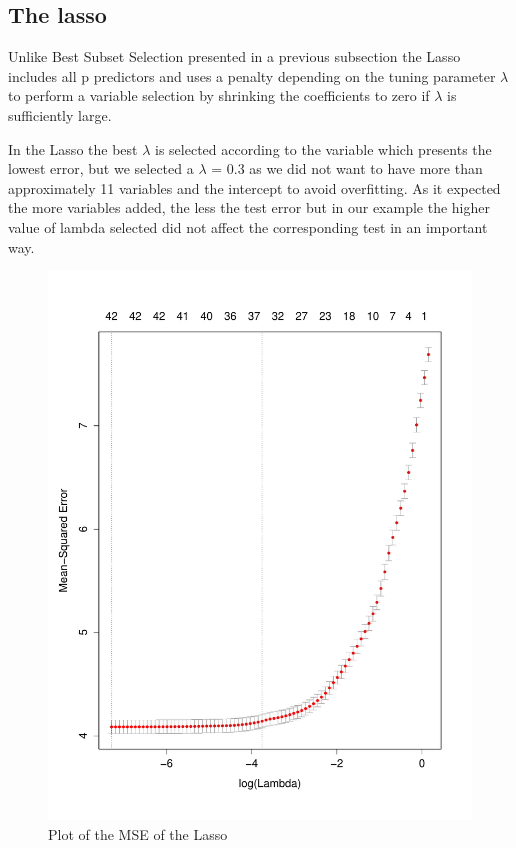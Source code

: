 \documentclass[11pt]{article}
\begin{document}
\subsection{The lasso}
Unlike Best Subset Selection presented in a previous subsection the Lasso includes all p predictors and uses a penalty depending on the tuning parameter $\lambda$ to perform a variable selection by shrinking the coefficients to zero if $\lambda$ is sufficiently large.

In the Lasso the best $\lambda$ is selected according to the variable which presents the lowest error, but we selected a $\lambda$ = 0.3 as we did not want to have more than approximately 11 variables and the intercept to avoid overfitting. As it expected the more variables added, the less the test error but in our example the higher value of lambda selected did not affect the corresponding test in an important way.


\begin{figure}[h]
    \centering
   \includegraphics[scale=0.3]{LASSO_ERROR_PLOT.pdf}
    \caption{Plot of the MSE of the Lasso}
    \label{fig:Plot of the MSE of the Lasso}
\end{figure}
\end{document}
